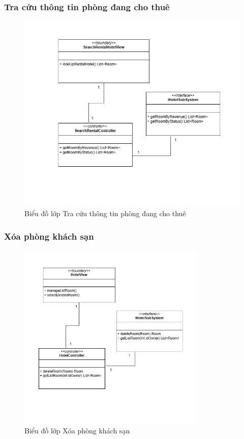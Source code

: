 \subsubsection{Tra cứu thông tin phòng đang cho thuê}
\begin{figure}[H]
    \centering
    \includegraphics[width=\textwidth]{img3.4.2/tracuuphong.jpg} 
    \caption{Biểu đồ lớp Tra cứu thông tin phòng đang cho thuê}
\end{figure}

\subsubsection{Xóa phòng khách sạn}
\begin{figure}[H]
    \centering
    \includegraphics[width=0.8\textwidth]{img3.4.2/xoaphong.jpg} 
    \caption{Biểu đồ lớp Xóa phòng khách sạn}
\end{figure}

